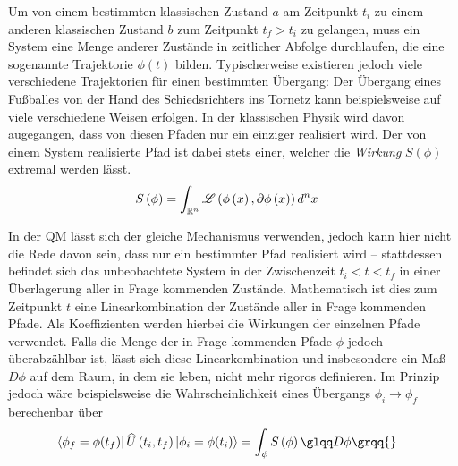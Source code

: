 Um von einem bestimmten klassischen Zustand $a$ am Zeitpunkt $t_i$ zu
einem anderen klassischen Zustand $b$ zum Zeitpunkt $t_f > t_i$ zu
gelangen, muss ein System eine Menge anderer Zustände in zeitlicher
Abfolge durchlaufen, die eine sogenannte Trajektorie $\phi(t)$
bilden. Typischerweise existieren jedoch viele verschiedene
Trajektorien für einen bestimmten Übergang: Der Übergang eines
Fußballes von der Hand des Schiedsrichters ins Tornetz kann
beispielsweise auf viele verschiedene Weisen erfolgen. In der
klassischen Physik wird davon augegangen, dass von diesen Pfaden nur
ein einziger realisiert wird. Der von einem System realisierte Pfad
ist dabei stets einer, welcher die \textit{Wirkung} $S(\phi)$ extremal
werden lässt. 
\begin{align}
  S\left(\phi\right) &= \int_{\mathbb{R}^n} \mathscr{L}\left(\phi\left(x\right),\partial \phi\left(x\right) \right) d^nx
\end{align}

In der QM lässt sich der gleiche Mechanismus verwenden, jedoch kann
hier nicht die Rede davon sein, dass nur ein bestimmter Pfad
realisiert wird -- stattdessen befindet sich das unbeobachtete System
in der Zwischenzeit $t_i < t < t_f$ in einer Überlagerung aller in
Frage kommenden Zustände. Mathematisch ist dies zum Zeitpunkt $t$ eine
Linearkombination der Zustände aller in Frage kommenden Pfade. Als
Koeffizienten werden hierbei die Wirkungen der einzelnen Pfade
verwendet. Falls die Menge der in Frage kommenden Pfade $\phi$  jedoch
überabzählbar ist, lässt sich diese Linearkombination und insbesondere
ein Maß \glqq$D\phi$\grqq{} auf dem Raum, in dem sie leben, nicht mehr rigoros
definieren. Im Prinzip jedoch wäre beispielsweise die
Wahrscheinlichkeit eines Übergangs $\phi_i\to\phi_f$ berechenbar über
\begin{align*}
 \bra{\phi_f=\phi(t_f)}
   \widehat{U}\left(t_i,t_f\right)
 \ket{\phi_i=\phi(t_i)}
  &= \int_{\phi} S\left(\phi\right) \glqq D\phi\grqq{}
\end{align*}
